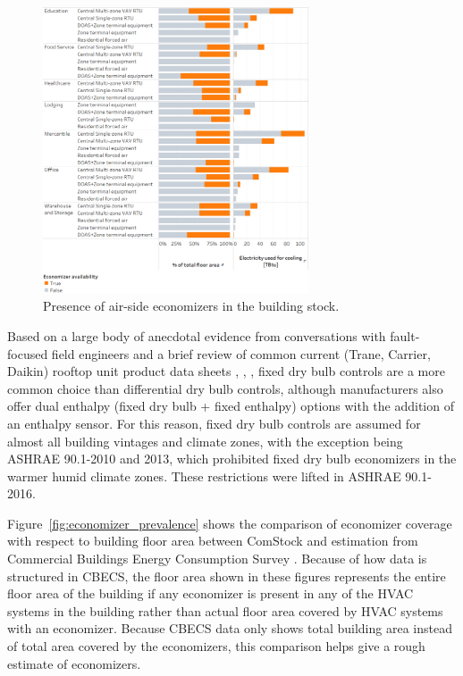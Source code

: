 \begin{figure}
  \centering \includegraphics[width=0.7\textwidth]{figures/economizer_presence.png}
  \caption{Presence of air-side economizers in the building stock.}
  \label{fig:economizer_presence}
\end{figure}

Based on a large body of anecdotal evidence from conversations with fault-focused field engineers and a brief review of common current (Trane, Carrier, Daikin) rooftop unit product data sheets \citep{trane_foundation}, \citep{carrier_economiser}, \citep{daikin_rebel}, fixed dry bulb controls are a more common choice than differential dry bulb controls, although manufacturers also offer dual enthalpy (fixed dry bulb + fixed enthalpy) options with the addition of an enthalpy sensor. For this reason, fixed dry bulb controls are assumed for almost all building vintages and climate zones, with the exception being ASHRAE 90.1-2010 and 2013, which prohibited fixed dry bulb economizers in the warmer humid climate zones. These restrictions were lifted in ASHRAE 90.1-2016.

Figure~\ref{fig:economizer_prevalence} shows the comparison of economizer coverage with respect to building floor area between ComStock and estimation from Commercial Buildings Energy Consumption Survey \citep{eia2018cbecs}. Because of how data is structured in CBECS, the floor area shown in these figures represents the entire floor area of the building if any economizer is present in any of the HVAC systems in the building rather than actual floor area covered by HVAC systems with an economizer. Because CBECS data only shows total building area instead of total area covered by the economizers, this comparison helps give a rough estimate of economizers.

